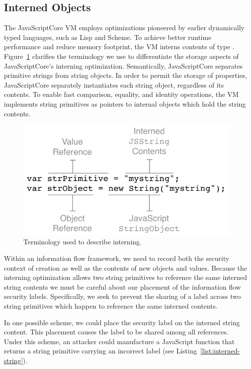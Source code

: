 \subsection{Interned Objects}\label{sec:interned-objects}

The JavaScriptCore VM employs optimizations pioneered by earlier dynamically typed languages, such as Lisp and Scheme.
To achieve better runtime performance and reduce memory footprint, the VM interns contents of type .
Figure~\ref{list:intern} clarifies the terminology we use to differentiate the storage aspects of JavaScriptCore's interning optimization.
Semantically, JavaScriptCore separates primitive strings from string objects.
In order to permit the storage of properties, JavaScriptCore separately instantiates each string object, regardless of its contents.
To enable fast comparison, equality, and identity operations, the VM implements string primitives as pointers to internal  objects which hold the string contents.

\begin{figure}[h]
  \centerline{\includegraphics[keepaspectratio=true]{images/InternedTerminology.pdf}}
  \caption{Terminology used to describe interning.}
  \label{list:intern}
\end{figure}

Within an information flow framework, we need to record both the security context of creation as well as the contents of new objects and values.
Because the interning optimization allows two string primitives to reference the same interned string contents we must be careful about our placement of the information flow security labels.
Specifically, we seek to prevent the sharing of a label across two string primitives which happen to reference the same interned contents.

In one possible scheme, we could place the security label on the interned string content.
This placement causes the label to be shared among all references.
Under this scheme, an attacker could manufacture a JavaScript function that returns a string primitive carrying an incorrect label (see Listing~\ref{list:interned-string}).

